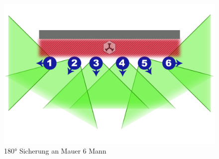 		\begin{figure}[htbp]
			\centering
			\includegraphics[width=0.8\linewidth]{./img/grundlagen/sicherungen/180grad_sicherung_6mann.jpg}
			\caption{180° Sicherung an Mauer 6 Mann}
		\end{figure}
\newpage